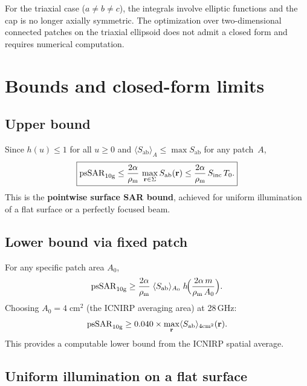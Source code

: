 \documentclass[11pt,a4paper]{article}
\theoremstyle{definition}
\theoremstyle{remark}
\newcommand{\Sab}{S_{\mathrm{ab}}}
\newcommand{\Sinc}{S_{\mathrm{inc}}}
\newcommand{\Tzero}{T_0}
\newcommand{\psSAR}{\ensuremath{\mathrm{psSAR}_{10\mathrm{g}}}}
\newcommand{\rhom}{\rho_{\mathrm{m}}}
\begin{document}
For the triaxial case ($a \neq b \neq c$), the integrals involve elliptic
functions and the cap is no longer axially symmetric. The optimization over
two-dimensional connected patches on the triaxial ellipsoid does not admit a
closed form and requires numerical computation.


\section{Bounds and closed-form limits}
\label{sec:bounds}

\subsection{Upper bound}

Since $h(u) \leq 1$ for all $u \geq 0$ and $\langle\Sab\rangle_A \leq \max\Sab$
for any patch~$A$,
\begin{equation}\label{eq:upper-bound}
  \boxed{%
    \psSAR \leq \frac{2\alpha}{\rhom}\,\max_{\vb{r}\in\Sigma}\Sab(\vb{r})
    \leq \frac{2\alpha}{\rhom}\,\Sinc\,\Tzero.
  }
\end{equation}
This is the \textbf{pointwise surface SAR bound}, achieved for uniform
illumination of a flat surface or a perfectly focused beam.

\subsection{Lower bound via fixed patch}

For any specific patch area $A_0$,
\begin{equation}\label{eq:lower-bound}
  \psSAR \geq \frac{2\alpha}{\rhom}\;\langle\Sab\rangle_{A_0}\;
  h\!\Bigl(\frac{2\alpha\,m}{\rhom\,A_0}\Bigr).
\end{equation}
Choosing $A_0 = 4\;\mathrm{cm}^2$ (the ICNIRP averaging area) at 28\,GHz:
\begin{equation}\label{eq:lower-4cm2}
  \psSAR \geq 0.040 \times \max_{\vb{r}}\langle\Sab\rangle_{4\mathrm{cm}^2}(\vb{r}).
\end{equation}
This provides a computable lower bound from the ICNIRP spatial average.

\subsection{Uniform illumination on a flat surface}
\end{document}
